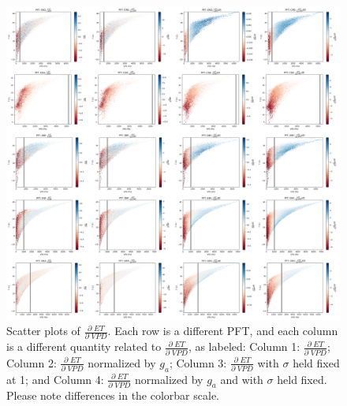 \documentclass[draft,linenumbers]{gcbjournal}
\begin{document}
\begin{figure}[!p]
\centering
\centerline{\includegraphics[width=1.4\textwidth]{./fig06.png}}
\caption{Scatter plots of $\frac{\partial \; ET}{\partial \; VPD}$. Each row is a different PFT, and each column is a different quantity related to $\frac{\partial \; ET}{\partial \; VPD}$, as labeled: Column 1: $\frac{\partial \; ET}{\partial \; VPD}$; Column 2: $\frac{\partial \; ET}{\partial \; VPD}$ normalized by $g_a$; Column 3: $\frac{\partial \; ET}{\partial \; VPD}$ with $\sigma$ held fixed at 1; and Column 4: $\frac{\partial \; ET}{\partial \; VPD}$ normalized by $g_a$ and with $\sigma$ held fixed. Please note differences in the colorbar scale.}
\label{real}
\end{figure}

\end{document}
